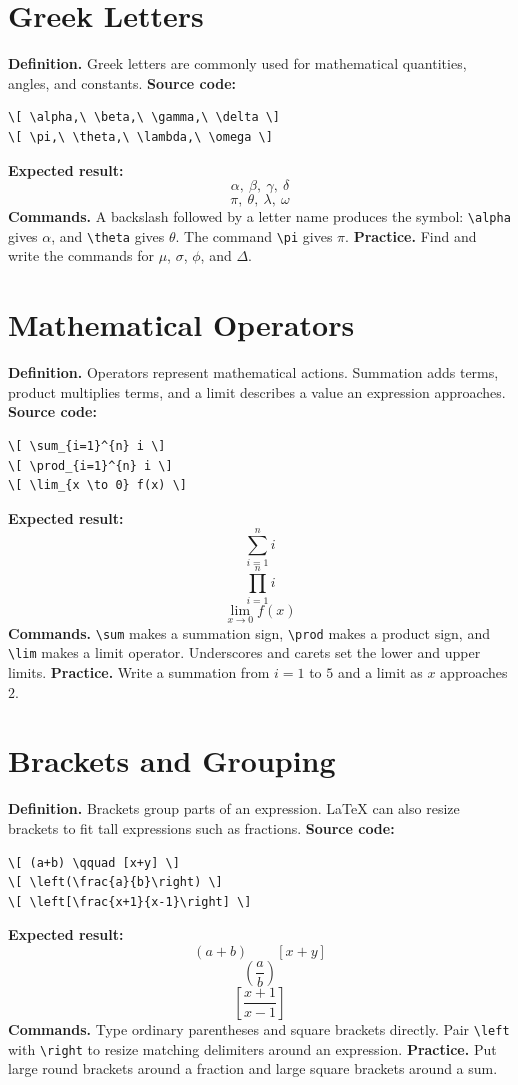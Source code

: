 \documentclass[11pt]{article}
\begin{document}
\section{Greek Letters}
\textbf{Definition.} Greek letters are commonly used for mathematical quantities, angles, and constants.
\textbf{Source code:}
\begin{verbatim}
\[ \alpha,\ \beta,\ \gamma,\ \delta \]
\[ \pi,\ \theta,\ \lambda,\ \omega \]
\end{verbatim}
\textbf{Expected result:}
\[ \alpha,\ \beta,\ \gamma,\ \delta \]
\[ \pi,\ \theta,\ \lambda,\ \omega \]
\textbf{Commands.} A backslash followed by a letter name produces the symbol: \verb|\alpha| gives $\alpha$, and \verb|\theta| gives $\theta$. The command \verb|\pi| gives $\pi$.
\textbf{Practice.} Find and write the commands for $\mu$, $\sigma$, $\phi$, and $\Delta$.

\section{Mathematical Operators}
\textbf{Definition.} Operators represent mathematical actions. Summation adds terms, product multiplies terms, and a limit describes a value an expression approaches.
\textbf{Source code:}
\begin{verbatim}
\[ \sum_{i=1}^{n} i \]
\[ \prod_{i=1}^{n} i \]
\[ \lim_{x \to 0} f(x) \]
\end{verbatim}
\textbf{Expected result:}
\[ \sum_{i=1}^{n} i \]
\[ \prod_{i=1}^{n} i \]
\[ \lim_{x \to 0} f(x) \]
\textbf{Commands.} \verb|\sum| makes a summation sign, \verb|\prod| makes a product sign, and \verb|\lim| makes a limit operator. Underscores and carets set the lower and upper limits.
\textbf{Practice.} Write a summation from $i=1$ to $5$ and a limit as $x$ approaches $2$.

\section{Brackets and Grouping}
\textbf{Definition.} Brackets group parts of an expression. LaTeX can also resize brackets to fit tall expressions such as fractions.
\textbf{Source code:}
\begin{verbatim}
\[ (a+b) \qquad [x+y] \]
\[ \left(\frac{a}{b}\right) \]
\[ \left[\frac{x+1}{x-1}\right] \]
\end{verbatim}
\textbf{Expected result:}
\[ (a+b) \qquad [x+y] \]
\[ \left(\frac{a}{b}\right) \]
\[ \left[\frac{x+1}{x-1}\right] \]
\textbf{Commands.} Type ordinary parentheses and square brackets directly. Pair \verb|\left| with \verb|\right| to resize matching delimiters around an expression.
\textbf{Practice.} Put large round brackets around a fraction and large square brackets around a sum.
\end{document}
